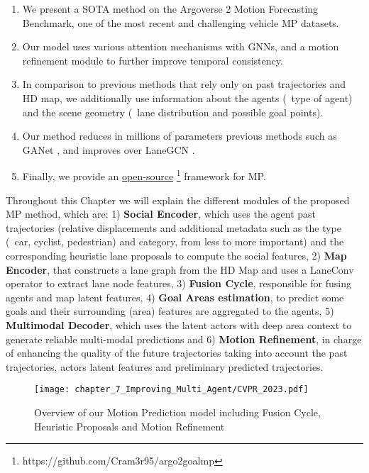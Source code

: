 \begin{enumerate}
	\item We present a \ac{SOTA} method on the Argoverse 2 Motion Forecasting Benchmark, one of the most recent and challenging vehicle \ac{MP} datasets.
	\item Our model uses various attention mechanisms with GNNs, and a motion refinement module to further improve temporal consistency.
	\item In comparison to previous methods that rely only on past trajectories and HD map, we additionally use information about the agents (\eg \ type of agent) and the scene geometry (\eg \ lane distribution and possible goal points).
	\item Our method reduces in millions of parameters previous methods such as GANet \cite{wang2022ganet}, and improves over LaneGCN \cite{liang2020learning}.
	\item Finally, we provide an \href{https://github.com/Cram3r95/argo2goalmp}{open-source} \footnote{https://github.com/Cram3r95/argo2goalmp} framework for \ac{MP}.
\end{enumerate}

Throughout this Chapter we will explain the different modules of the proposed \ac{MP} method, which are: 1) \textbf{Social Encoder}, which uses the agent past trajectories (relative displacements and additional metadata such as the type (\eg \ car, cyclist, pedestrian) and category, from less to more important) and the corresponding heuristic lane proposals to compute the social features, 2) \textbf{Map Encoder}, that constructs a lane graph from the HD Map and uses a LaneConv operator \cite{liang2020learning} to extract lane node features, 3) \textbf{Fusion Cycle}, responsible for fusing agents and map latent features, 4) \textbf{Goal Areas estimation}, to predict some goals and their surrounding  (area) features are aggregated to the agents, 5) \textbf{Multimodal Decoder}, which uses the latent actors with deep area context to generate reliable multi-modal predictions and 6) \textbf{Motion Refinement}, in charge of enhancing the quality of the future trajectories taking into account the past trajectories, actors latent features and preliminary predicted trajectories.

\begin{figure}[h] 
	\centering
	\texttt{[image: chapter\_7\_Improving\_Multi\_Agent/CVPR\_2023.pdf]}
	\caption{Overview of our Motion Prediction model including Fusion Cycle, Heuristic Proposals and Motion Refinement}
	\label{fig:chapter_7_Improving_Multi_Agent/CVPR_2023}
\end{figure}

